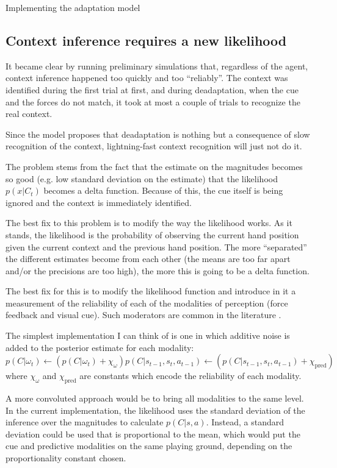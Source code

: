 \documentclass{report}
\begin{document}
\begin{chapter}{Implementing the adaptation model}
\subsection{Context inference requires a new likelihood}
\label{subsec:new-likelihood}
It became clear by running preliminary simulations that, regardless of the
agent, context inference happened too quickly and too ``reliably''. The context
was identified during the first trial at first, and during deadaptation, when
the cue and the forces do not match, it took at most a couple of trials to
recognize the real context.

Since the model proposes that deadaptation is nothing but a consequence of slow
recognition of the context, lightning-fast context recognition will just not do
it.

The problem stems from the fact that the estimate on the magnitudes becomes so
good (e.g. low standard deviation on the estimate) that the likelihood
$p(x | C_t)$ becomes a delta function. Because of this, the cue itself is being
ignored and the context is immediately identified.

The best fix to this problem is to modify the way the likelihood works. As it
stands, the likelihood is the probability of observing the current hand position
given the current context and the previous hand position. The more ``separated''
the different estimates become from each other (the means are too far apart
and/or the precisions are too high), the more this is going to be a delta
function.

The best fix for this is to modify the likelihood function and introduce in it a
measurement of the reliability of each of the modalities of perception (force
feedback and visual cue). Such moderators are common in the literature
\citep[e.g.][]{Lee_Neural_2014}.

The simplest implementation I can think of is
one in which additive noise is added to the posterior estimate for each
modality:
\begin{equation}
p(C | \omega_t) \leftarrow (p(C | \omega_t) + \chi_{\omega})
p(C | s_{t-1}, s_t, a_{t-1}) \leftarrow (p(C |  s_{t-1}, s_t, a_{t-1}) + \chi_{\text{pred}})
\end{equation}
where $\chi_{\omega}$ and $\chi_{\text{pred}}$ are constants which encode the
reliability of each modality.

A more convoluted approach would be to bring all modalities to the same
level. In the current implementation, the likelihood uses the standard deviation
of the inference over the magnitudes to calculate $p(C | s, a)$. Instead, a
standard deviation could be used that is proportional to the mean, which would
put the cue and predictive modalities on the same playing ground, depending on
the proportionality constant chosen.


\end{chapter}
\end{document}
